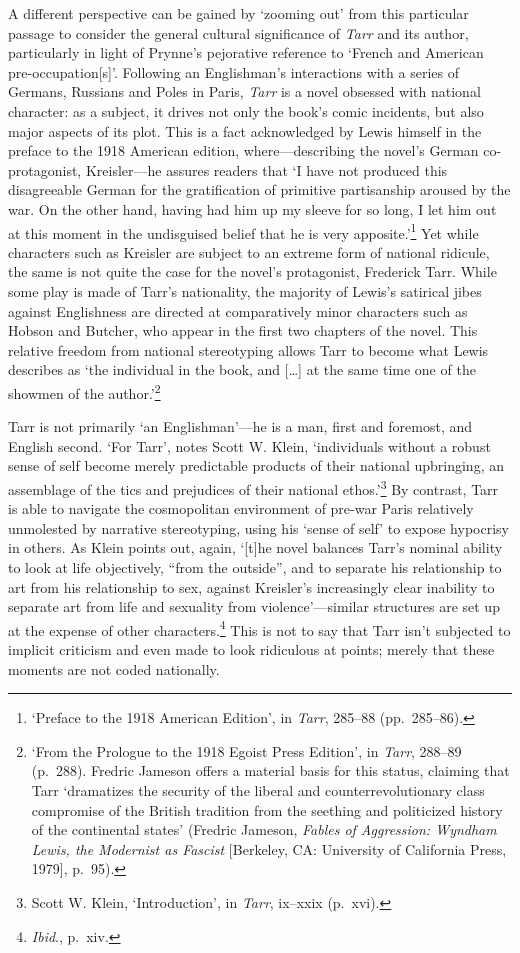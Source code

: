 \documentclass[]{article}
\begin{document}
A different perspective can be gained by `zooming out' from this
particular passage to consider the general cultural significance of
\emph{Tarr} and its author, particularly in light of Prynne's pejorative
reference to `French and American pre-occupation{[}s{]}'. Following an
Englishman's interactions with a series of Germans, Russians and Poles
in Paris, \emph{Tarr} is a novel obsessed with national character: as a
subject, it drives not only the book's comic incidents, but also major
aspects of its plot. This is a fact acknowledged by Lewis himself in the
preface to the 1918 American edition, where---describing the novel's
German co-protagonist, Kreisler---he assures readers that `I have not
produced this disagreeable German for the gratification of primitive
partisanship aroused by the war. On the other hand, having had him up my
sleeve for so long, I let him out at this moment in the undisguised
belief that he is very apposite.'\footnote{`Preface to the 1918 American
  Edition', in \emph{Tarr}, 285--88 (pp.~285--86).} Yet while characters
such as Kreisler are subject to an extreme form of national ridicule,
the same is not quite the case for the novel's protagonist, Frederick
Tarr. While some play is made of Tarr's nationality, the majority of
Lewis's satirical jibes against Englishness are directed at
comparatively minor characters such as Hobson and Butcher, who appear in
the first two chapters of the novel. This relative freedom from national
stereotyping allows Tarr to become what Lewis describes as `the
individual in the book, and {[}\ldots{}{]} at the same time one of the
showmen of the author.'\footnote{`From the Prologue to the 1918 Egoist
  Press Edition', in \emph{Tarr}, 288--89 (p.~288). Fredric Jameson
  offers a material basis for this status, claiming that Tarr
  `dramatizes the security of the liberal and counterrevolutionary class
  compromise of the British tradition from the seething and politicized
  history of the continental states' (Fredric Jameson, \emph{Fables of
  Aggression: Wyndham Lewis, the Modernist as Fascist} {[}Berkeley, CA:
  University of California Press, 1979{]}, p.~95).}

Tarr is not primarily `an Englishman'---he is a man, first and foremost,
and English second. `For Tarr', notes Scott W. Klein, `individuals
without a robust sense of self become merely predictable products of
their national upbringing, an assemblage of the tics and prejudices of
their national ethos.'\footnote{Scott W. Klein, `Introduction', in
  \emph{Tarr}, ix--xxix (p.~xvi).} By contrast, Tarr is able to navigate
the cosmopolitan environment of pre-war Paris relatively unmolested by
narrative stereotyping, using his `sense of self' to expose hypocrisy in
others. As Klein points out, again, `{[}t{]}he novel balances Tarr's
nominal ability to look at life objectively, ``from the outside'', and
to separate his relationship to art from his relationship to sex,
against Kreisler's increasingly clear inability to separate art from
life and sexuality from violence'---similar structures are set up at the
expense of other characters.\footnote{\emph{Ibid}., p.~xiv.} This is not
to say that Tarr isn't subjected to implicit criticism and even made to
look ridiculous at points; merely that these moments are not coded
nationally.
\end{document}
